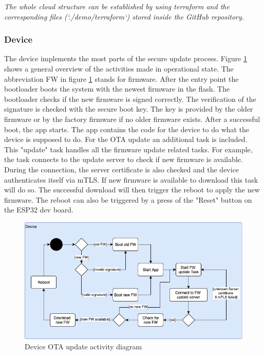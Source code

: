 \textit{The whole cloud structure can be established by using terraform and the corresponding files (`./demo/terraform`) stored inside the GitHub repository.}

\subsubsection{Device}
The device implements the most parts of the secure update process. Figure \ref{fig:poc-activity-diagram} shows a general overview of the activities made in operational state. The abbreviation FW in figure \ref{fig:poc-activity-diagram} stands for firmware. After the entry point the bootloader boots the system with the newest firmware in the flash. The bootloader checks if the new firmware is signed correctly. The verification of the signature is checked with the secure boot key. The key is provided by the older firmware or by the factory firmware if no older firmware exists. After a successful boot, the app starts. The app contains the code for the device to do what the device is supposed to do. For the OTA update an additional task is included. This "update" task handles all the firmware update related tasks. For example, the task connects to the update server to check if new firmware is available. During the connection, the server certificate is also checked and the device authenticates itself via mTLS. If new firmware is available to download this task will do so. The successful download will then trigger the reboot to apply the new firmware. The reboot can also be triggered by a press of the "Reset" button on the ESP32 dev board.

\begin{figure}[H]
    \centering
    \fontsize{8}{10}\selectfont
    \includegraphics[width=\textwidth]{proof-of-concept/assets/activity-diagram.drawio.png}
    \caption{Device OTA update activity diagram}\label{fig:poc-activity-diagram}
\end{figure}

